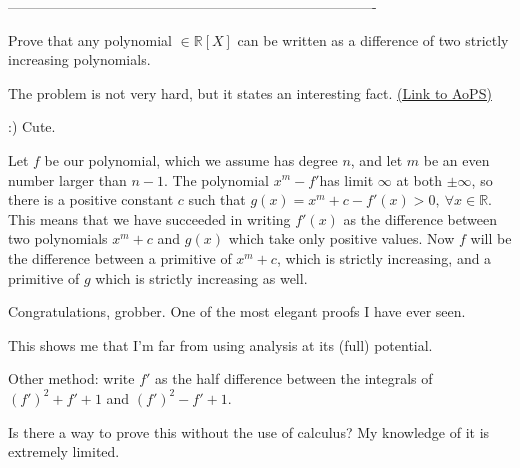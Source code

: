 -------------------------------------------------------------------------------

\begin{problem}
	Prove that any polynomial $\in \mathbb{R} [X]$ can be written as a difference of two strictly increasing polynomials.

The problem is not very hard, but it states an interesting fact.
	\flushright \href{https://artofproblemsolving.com/community/c6h66713}{(Link to AoPS)}
\end{problem}



\begin{solution}
	:) Cute.

Let $f$ be our polynomial, which we assume has degree $n$, and let $m$ be an even number larger than $n-1$. The polynomial $x^m-f'$has limit $\infty$ at both $\pm\infty$, so there is a positive constant $c$ such that $g(x)=x^m+c-f'(x)>0,\ \forall x\in\mathbb R$. This means that we have succeeded in writing $f'(x)$ as the difference between two polynomials $x^m+c$ and $g(x)$ which take only positive values. Now $f$ will be the difference between a primitive of $x^m+c$, which is strictly increasing, and a primitive of $g$ which is strictly increasing as well.
\end{solution}



\begin{solution}
	Congratulations, grobber. One of the most elegant proofs I have ever seen.

This shows me that I'm far from using analysis at its (full) potential.
\end{solution}



\begin{solution}
	Other method: write $f'$ as the half difference between the integrals of $(f')^2+f'+1$ and $(f')^2-f'+1$.
\end{solution}



\begin{solution}
	Is there a way to prove this without the use of calculus? My knowledge of it is extremely limited.
\end{solution}



